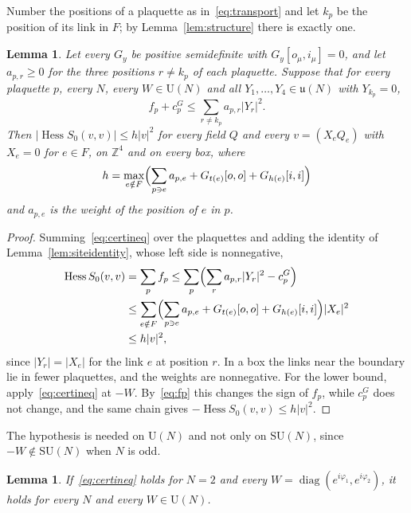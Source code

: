 \documentclass[11pt]{amsart}
\newtheorem{lemma}[theorem]{Lemma}
\theoremstyle{definition}
\theoremstyle{remark}
\numberwithin{equation}{section}
\newcommand{\Z}{\mathbb{Z}}
\newcommand{\SU}{\mathrm{SU}}
\newcommand{\U}{\mathrm{U}}
\newcommand{\Hess}{\operatorname{Hess}}
\begin{document}
Number the positions of a plaquette as in~\eqref{eq:transport} and let
$k_p$ be the position of its link in $F$; by Lemma~\ref{lem:structure}
there is exactly one.

\begin{lemma}\label{lem:certificate}
Let every $G_y$ be positive semidefinite with $G_y[o_\mu,i_\mu]=0$, and let
$a_{p,r}\ge0$ for the three positions $r\ne k_p$ of each plaquette. Suppose
that for every plaquette $p$, every $N$, every $W\in\U(N)$ and all
$Y_1,\dots,Y_4\in\mathfrak u(N)$ with $Y_{k_p}=0$,
\begin{equation}\label{eq:certineq}
f_p+c^G_p\le\sum_{r\ne k_p}a_{p,r}|Y_r|^2 .
\end{equation}
Then $|\Hess S_0(v,v)|\le h|v|^2$ for every field $Q$ and every $v=(X_eQ_e)$
with $X_e=0$ for $e\in F$, on $\Z^4$ and on every box, where
\[
h=\max_{e\notin F}\Bigl(\sum_{p\ni e}a_{p,e}+G_{t(e)}[o,o]+G_{h(e)}[i,i]
\Bigr)
\]
and $a_{p,e}$ is the weight of the position of $e$ in $p$.
\end{lemma}

\begin{proof}
Summing~\eqref{eq:certineq} over the plaquettes and adding the identity of
Lemma~\ref{lem:siteidentity}, whose left side is nonnegative,
\[
\begin{split}
\Hess S_0(v,v)&=\sum_pf_p\le\sum_p\Bigl(\sum_ra_{p,r}|Y_r|^2-c^G_p\Bigr)\\
&\le\sum_{e\notin F}\Bigl(\sum_{p\ni e}a_{p,e}+G_{t(e)}[o,o]+G_{h(e)}[i,i]
\Bigr)|X_e|^2\\
&\le h|v|^2,
\end{split}
\]
since $|Y_r|=|X_e|$ for the link $e$ at position $r$. In a box the links
near the boundary lie in fewer plaquettes, and the weights are nonnegative.
For the lower bound, apply~\eqref{eq:certineq} at $-W$. By~\eqref{eq:fp}
this changes the sign of $f_p$, while $c^G_p$ does not change, and the same
chain gives $-\Hess S_0(v,v)\le h|v|^2$.
\end{proof}

The hypothesis is needed on $\U(N)$ and not only on $\SU(N)$, since
$-W\notin\SU(N)$ when $N$ is odd.

\begin{lemma}\label{lem:certu2}
If~\eqref{eq:certineq} holds for $N=2$ and every
$W=\operatorname{diag}(e^{i\varphi_1},e^{i\varphi_2})$, it holds for
every $N$ and every $W\in\U(N)$.
\end{lemma}
\end{document}
